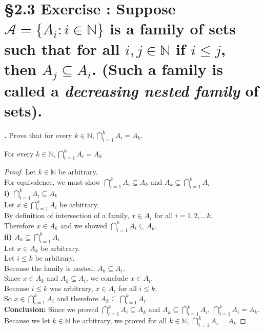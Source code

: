 \documentclass[a4paper,11pt]{article}
\begin{document}
\newpage

\setcounter{ProblemCounter}{16}
\setcounter{SubsectionCounter}{1}
\section*{\S 2.3 Exercise : Suppose \(\mathscr{A}=\{A_i: i \in \mathbb{N}\}\) is a family of sets such that for all \(i, j \in \mathbb{N}\) if \(i \leq j\), then \(A_j \subseteq A_i\). (Such a family is called a \textit{decreasing nested family} of sets).}
\textbf{.}
Prove that for every \(k \in \mathbb{N}, \bigcap\limits_{i=1}^kA_i=A_k\).
\begin{theorem2}
For every \(k \in \mathbb{N}, \bigcap\limits_{i=1}^kA_i=A_k\)
  \begin{proof}
    Let \(k \in \mathbb{N}\) be arbitrary.\\
    For equivalence, we must show \(\bigcap\limits_{i=1}^kA_i \subseteq A_k\) and \(A_k \subseteq \bigcap\limits_{i=1}^kA_i\)\\
    \textbf{i) \(\bigcap\limits_{i=1}^kA_i \subseteq A_k\)}\\
    Let \(x \in \bigcap\limits_{i=1}^kA_i\) be arbitrary.\\
    By definition of intersection of a family, \(x \in A_i\) for all \(i = 1, 2, \ldots k\).\\
    Therefore \(x \in A_k\) and we showed \(\bigcap\limits_{i=1}^kA_i \subseteq 
    A_k\).\\
    \textbf{ii) \(A_k \subseteq \bigcap\limits_{i=1}^kA_i\)}\\
    Let \(x \in A_k\) be arbitrary.\\
    Let \(i \leq k\) be arbitrary.\\
    Because the family is nested, \(A_k \subseteq A_i\).\\
    Since \(x \in A_k\) and \(A_k \subseteq A_i\), we conclude \(x \in A_i\).\\
    Because \(i \leq k\) was arbitrary, \(x \in A_i\) for all \(i \leq k\).\\
    So \(x \in \bigcap\limits_{i=1}^kA_i\) and therefore \(A_k \subseteq \bigcap\limits_{i=1}^kA_i\).\\
    \textbf{Conclusion:}
    Since we proved \(\bigcap\limits_{i=1}^kA_i \subseteq A_k\) and \(A_k \subseteq \bigcap\limits_{i=1}^kA_i\), \(\bigcap\limits_{i=1}^kA_i=A_k\).\\
    Because we let \(k \in \mathbb{N}\) be arbitrary, we proved for all \(k \in 
    \mathbb{N}\), \(\bigcap\limits_{i=1}^kA_i=A_k\)
  \end{proof}
\end{theorem2}
\end{document}
